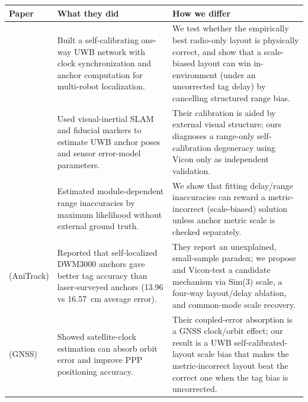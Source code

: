 \documentclass[10pt,a4paper]{article}
\makeatletter
\renewcommand\section{\@startsection{section}{1}{0pt}{0.65ex plus .2ex}{0.35ex}{\normalfont\normalsize\bfseries}}
\makeatother
\begin{document}
\begin{center}
\scriptsize
\begin{tabularx}{\textwidth}{@{}>{\raggedright\arraybackslash}p{28mm}>{\raggedright\arraybackslash}X>{\raggedright\arraybackslash}X@{}}
\toprule
Paper & What they did & How we differ \\
\midrule
\citet{hamer_2018_self_calibrating_ultra_wideband_network} & Built a self-calibrating one-way UWB network with clock synchronization and anchor computation for multi-robot localization. & We test whether the empirically best radio-only layout is physically correct, and show that a scale-biased layout can win in-environment (under an uncorrected tag delay) by cancelling structured range bias. \\
\citet{lutz_2019_visual_inertial_slam_uwb_error_model} & Used visual-inertial SLAM and fiducial markers to estimate UWB anchor poses and sensor error-model parameters. & Their calibration is aided by external visual structure; ours diagnoses a range-only self-calibration degeneracy using Vicon only as independent validation. \\
\citet{ledergerber_2018_calibrating_away_inaccuracies_uwb} & Estimated module-dependent range inaccuracies by maximum likelihood without external ground truth. & We show that fitting delay/range inaccuracies can reward a metric-incorrect (scale-biased) solution unless anchor metric scale is checked separately. \\
\citet{luder_2025_anitrack} (AniTrack) & Reported that self-localized DWM3000 anchors gave better tag accuracy than laser-surveyed anchors (13.96 vs 16.57~cm average error). & They report an unexplained, small-sample paradox; we propose and Vicon-test a candidate mechanism via Sim(3) scale, a four-way layout/delay ablation, and common-mode scale recovery. \\
\citet{pan_2015_realtime_ppp_clock_orbit} (GNSS) & Showed satellite-clock estimation can absorb orbit error and improve PPP positioning accuracy. & Their coupled-error absorption is a GNSS clock/orbit effect; our result is a UWB self-calibrated-layout scale bias that makes the metric-incorrect layout beat the correct one when the tag bias is uncorrected. \\
\bottomrule
\end{tabularx}
\end{center}

\section{Risk and Status}
\end{document}
